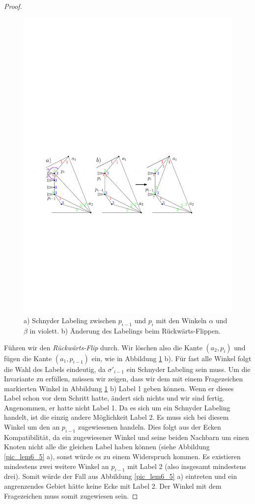 \begin{proof}
\begin{figure}
	\centering
	  \includegraphics[width=1\textwidth]{lem6_4.pdf}
    	\caption{a) Schnyder Labeling zwischen $p_{i-1}$ und $p_{i}$ mit den Winkeln $\alpha$ und $\beta$ in violett. b) Änderung des Labelings beim Rückwärts-Flippen.}
    	\label{pic_lem6_4}
\end{figure}

Führen wir den \textit{Rückwärts-Flip} durch. Wir löschen also die Kante $(a_2,p_i)$ und fügen die Kante $(a_1,p_{i-1})$ ein, wie in Abbildung \ref{pic_lem6_4} b). Für fast alle Winkel folgt die Wahl des Labels eindeutig, da $\sigma'_{i-1}$ ein Schnyder Labeling sein muss. Um die Invariante zu erfüllen, müssen wir zeigen, dass wir dem mit einem Fragezeichen markierten Winkel in Abbildung \ref{pic_lem6_4} b) Label 1 geben können. Wenn er dieses Label schon vor dem Schritt hatte, ändert sich nichts und wir sind fertig. Angenommen, er hatte nicht Label 1. Da es sich um ein Schnyder Labeling handelt, ist die einzig andere Möglichkeit Label 2. Es muss sich bei diesem Winkel um den an $p_{i-1}$ zugewiesenen handeln. Dies folgt aus der Ecken Kompatibilität, da ein zugewiesener Winkel und seine beiden Nachbarn um einen Knoten nicht alle die gleichen Label haben können (siehe Abbildung \ref{pic_lem6_5} a), sonst würde es zu einem Widerspruch kommen. Es existieren mindestens zwei weitere Winkel an $p_{i-1}$ mit Label 2 (also insgesamt mindestens drei). Somit würde der Fall aus Abbildung \ref{pic_lem6_5} a) eintreten und ein angrenzendes Gebiet hätte keine Ecke mit Label 2. Der Winkel mit dem Fragezeichen muss somit zugewiesen sein.


\end{proof}
